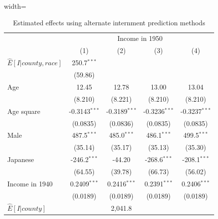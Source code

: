 \begin{table}[htbp]
   \caption{\label{tbl:reg_altint} Estimated effects using alternate internment prediction methods}
   \begin{adjustbox}{width=\textwidth}
   \begin{tabular}{lcccc}
      \toprule
       & \multicolumn{4}{c}{Income in 1950}\\
                                                & (1)             & (2)             & (3)             & (4)\\  
      \midrule 
      $\hat{E}[I|county,race]$                  & 250.7$^{***}$   &                 &                 &   \\   
                                                & (59.86)         &                 &                 &   \\   
      Age                                       & 12.45           & 12.78           & 13.00           & 13.04\\   
                                                & (8.210)         & (8.221)         & (8.210)         & (8.210)\\   
      Age square                                & -0.3143$^{***}$ & -0.3189$^{***}$ & -0.3236$^{***}$ & -0.3237$^{***}$\\   
                                                & (0.0835)        & (0.0836)        & (0.0835)        & (0.0835)\\   
      Male                                      & 487.5$^{***}$   & 485.0$^{***}$   & 486.1$^{***}$   & 499.5$^{***}$\\   
                                                & (35.14)         & (35.17)         & (35.13)         & (35.30)\\   
      Japanese                                  & -246.2$^{***}$  & -44.20          & -268.6$^{***}$  & -208.1$^{***}$\\   
                                                & (64.55)         & (39.78)         & (66.73)         & (56.02)\\   
      Income in 1940                            & 0.2409$^{***}$  & 0.2416$^{***}$  & 0.2391$^{***}$  & 0.2406$^{***}$\\   
                                                & (0.0189)        & (0.0189)        & (0.0189)        & (0.0189)\\   
      $\hat{E}[I|county]$                       &                 & 2,041.8         &                 &   \\   

\end{tabular}
\end{adjustbox}
\end{table}
